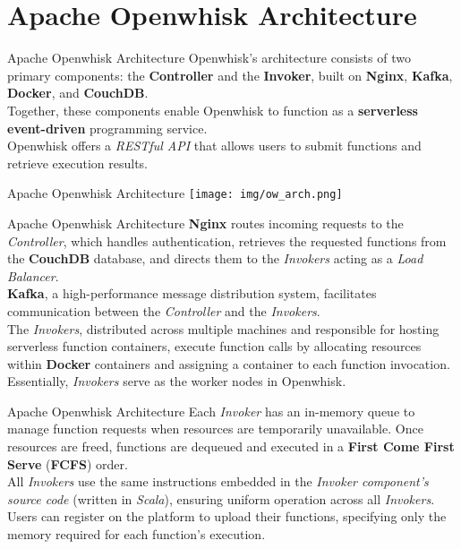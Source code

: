 \documentclass[aspectratio=169]{beamer}
\begin{document}
\section{Apache Openwhisk Architecture}
\begin{frame}{Apache Openwhisk Architecture}
Openwhisk’s architecture consists of two primary components: the \textbf{Controller} and the \textbf{Invoker}, built on \textbf{Nginx}, \textbf{Kafka}, \textbf{Docker}, and \textbf{CouchDB}.\vspace{14pt}\\
Together, these components enable Openwhisk to function as a \textbf{serverless event-driven} programming service.\vspace{14pt}\\
Openwhisk offers a \textit{RESTful API} that allows users to submit functions and retrieve execution results.
\end{frame}

\begin{frame}{Apache Openwhisk Architecture}
\centering
\texttt{[image: img/ow\_arch.png]}
\end{frame}

\begin{frame}{Apache Openwhisk Architecture}
\textbf{Nginx} routes incoming requests to the \textit{Controller}, which handles authentication, retrieves the requested functions from the \textbf{CouchDB} database, and directs them to the \textit{Invokers} acting as a \textit{Load Balancer}.\vspace{14pt}\\
\textbf{Kafka}, a high-performance message distribution system, facilitates communication between the \textit{Controller} and the \textit{Invokers}.\vspace{14pt}\\
The \textit{Invokers}, distributed across multiple machines and responsible for hosting serverless function containers, execute function calls by allocating resources within \textbf{Docker} containers and assigning a container to each function invocation. Essentially, \textit{Invokers} serve as the worker nodes in Openwhisk.
\end{frame}

\begin{frame}{Apache Openwhisk Architecture}
Each \textit{Invoker} has an in-memory queue to manage function requests when resources are temporarily unavailable. Once resources are freed, functions are dequeued and executed in a \textbf{First Come First Serve} (\textbf{FCFS}) order.\vspace{14pt}\\
All \textit{Invokers} use the same instructions embedded in the \textit{Invoker component’s source code} (written in \textit{Scala}), ensuring uniform operation across all \textit{Invokers}.\vspace{14pt}\\
Users can register on the platform to upload their functions, specifying only the memory required for each function’s execution.
\end{frame}
\end{document}
